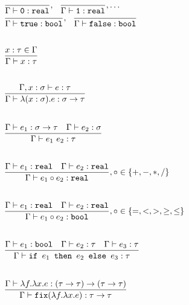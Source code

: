 \[
\begin{array}{lr}
\dfrac{}{\Gamma \vdash \texttt{0}: \texttt{real}}, \ \ \dfrac{}{\Gamma \vdash \texttt{1}: \texttt{real}}, \ldots \\
\dfrac{}{\Gamma \vdash \texttt{true} : \texttt{bool}}, \ \ \dfrac{}{\Gamma \vdash \texttt{false} : \texttt{bool}} \\ \\ \\
\dfrac{x : \tau \in \Gamma}{\Gamma \vdash x : \tau } \\ \\ \\
\dfrac{\Gamma, x : \sigma \vdash e : \tau}{\Gamma \vdash \lambda (x : \sigma).e : \sigma \rightarrow \tau } \\ \\ \\ 
\dfrac{\Gamma \vdash e_1: \sigma \rightarrow \tau \ \ \ \Gamma \vdash e_2 : \sigma}{\Gamma \vdash e_1 \ e_2 : \tau} \\ \\ \\
\dfrac{\Gamma \vdash e_1 : \texttt{real} \ \ \ \Gamma \vdash e_2 : \texttt{real}}{\Gamma \vdash e_1 \circ e_2 : \texttt{real}}
, \circ \in \{+,-,*,/\} \\ \\ \\
\dfrac{\Gamma \vdash e_1 : \texttt{real} \ \ \ \Gamma \vdash e_2 : \texttt{real}}{\Gamma \vdash e_1 \circ e_2 : \texttt{bool}}
, \circ \in \{=, <, >, \geq, \leq\} \\ \\ \\
\dfrac{\Gamma \vdash e_1 : \texttt{bool} \ \ \ \Gamma \vdash e_2 : \tau \ \ \ \Gamma \vdash e_3 : \tau}
{\Gamma \vdash \ifelse{e_1}{e_2}{e_3} : \tau} \\ \\ \\
\dfrac{\Gamma \vdash \lambda f. \lambda x.e : (\tau \rightarrow \tau) \rightarrow (\tau \rightarrow \tau)}
{\Gamma \vdash \texttt{fix}(\lambda f. \lambda x.e) : \tau \rightarrow \tau} \\ \\ \\ 
\end{array}
\]

